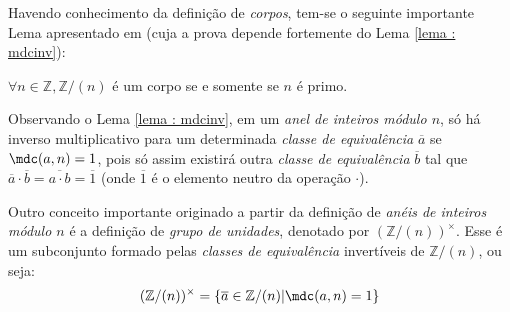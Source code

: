 Havendo conhecimento da definição de \textit{corpos}, tem-se o seguinte importante Lema apresentado em \cite[p.47]{book:2399854} (cuja a prova depende fortemente do Lema \ref{lema : mdcinv}):
    \begin{lema}
        $\forall n \in \mathbb{Z}, \mathbb{Z}/(n)$ é um corpo se e somente se $n$ é primo. 
    \end{lema}




Observando o Lema \ref{lema : mdcinv}, em um \textit{anel de inteiros módulo $n$}, só há inverso multiplicativo para um determinada \textit{classe de equivalência} $\overline{a}$ se $\mdc(a, n) = 1$, pois só assim existirá outra \textit{classe de equivalência} $\overline{b}$ tal que $\overline{a} \cdot \overline{b} = \overline{a \cdot b} = \overline{1}$ (onde $\overline{1}$ é o elemento neutro da operação $\cdot$).

Outro conceito importante originado a partir da definição de \textit{anéis de inteiros módulo $n$} é a definição de \textit{grupo de unidades}, denotado por $(\mathbb{Z}/(n))^{\times}$. Esse é um subconjunto formado pelas \textit{classes de equivalência} invertíveis de $\mathbb{Z}/(n)$, ou seja:
\begin{equation} \label{def:totientset}
    (\mathbb{Z}/(n))^{\times} = \{\overline{a} \in \mathbb{Z}/(n) | \mdc(a, n) = 1\}
\end{equation}

